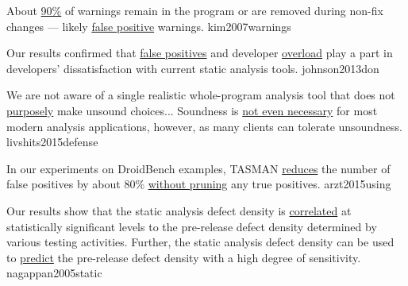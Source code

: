 \documentclass{article}
\begin{document}
  {About \ul{90\%} of warnings remain in the program or are removed during non-fix changes --- likely \ul{false positive} warnings.}
  {kim2007warnings}

  {Our results confirmed that \ul{false positives} and developer \ul{overload} play a part in developers' dissatisfaction with current static analysis tools.}
  {johnson2013don}

  {We are not aware of a single realistic whole-program analysis tool that does not \ul{purposely} make unsound choices... Soundness is \ul{not even necessary} for most modern analysis applications, however, as many clients can tolerate unsoundness.}
  {livshits2015defense}

  {In our experiments on DroidBench examples, TASMAN \ul{reduces} the number of false positives by about 80\% \ul{without pruning} any true positives.}
  {arzt2015using}

  {Our results show that the static analysis defect density is \ul{correlated} at statistically significant levels to the pre-release defect density determined by various testing activities. Further, the static analysis defect density can be used to \ul{predict} the pre-release defect density with a high degree of sensitivity.}
  {nagappan2005static}


\end{document}
